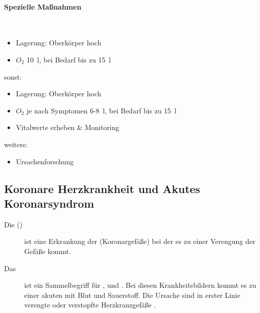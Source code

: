 \begin{gMassnahmenEnv}
    
    \paragraph{Spezielle Ma{\ss}nahmen} ~
    
    \gTxBeiVit \gTxMassVitBes
    \begin{itemize}
        \item Lagerung: Oberk\"orper hoch
        \item $O_2$ 10~l, bei Bedarf bis zu 15~l
    \end{itemize}
    
    sonst:
    \begin{itemize}
        \item Lagerung: Oberk\"orper hoch
        \item $O_2$ je nach Symptomen 6-8~l, bei Bedarf bis zu 15~l
        \item Vitalwerte erheben \& Monitoring
    \end{itemize}
    
    weiters:
    \begin{itemize}
        \item Ursachenforschung
    \end{itemize}
    
\end{gMassnahmenEnv}

\subsection{Koronare Herzkrankheit und Akutes Koronarsyndrom}



\begin{description}
	\item[Die 
	()] ist eine Erkrankung der
	 (Koronargefä{\ss}e)
	bei der es zu einer Verengung der Gefä{\ss}e kommt.

	\item[Das ] ist ein
	Sammelbegriff f\"ur ,  und .
	Bei diesen Krankheitsbildern kommt es zu einer akuten
	 mit Blut und
	Sauerstoff. Die Ursache sind in erster Linie verengte oder verstopfte
	Herzkranzgefä{\ss}e . 

\end{description}

